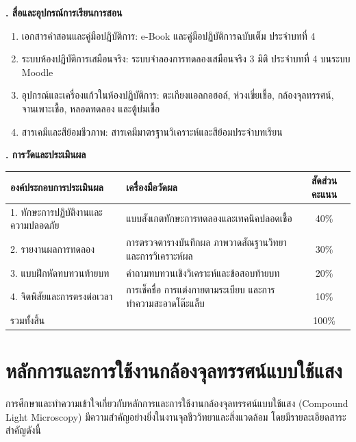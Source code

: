 \noindent\textbf{. สื่อและอุปกรณ์การเรียนการสอน}

\begin{enumerate}
    \item เอกสารคำสอนและคู่มือปฏิบัติการ: e-Book และคู่มือปฏิบัติการฉบับเต็ม ประจำบทที่ 4
    \item ระบบห้องปฏิบัติการเสมือนจริง: ระบบจำลองการทดลองเสมือนจริง 3 มิติ ประจำบทที่ 4 บนระบบ Moodle
    \item อุปกรณ์และเครื่องแก้วในห้องปฏิบัติการ: ตะเกียงแอลกอฮอล์, ห่วงเขี่ยเชื้อ, กล้องจุลทรรศน์, จานเพาะเชื้อ, หลอดทดลอง และตู้บ่มเชื้อ
    \item สารเคมีและสีย้อมชีวภาพ: สารเคมีมาตรฐานวิเคราะห์และสีย้อมประจำบทเรียน
\end{enumerate}

\noindent\textbf{. การวัดและประเมินผล}

\begin{table}[H]
\centering\small
\begin{tabularx}{\textwidth}{p{} p{} c}
\toprule
\textbf{องค์ประกอบการประเมินผล} & \textbf{เครื่องมือวัดผล} & \textbf{สัดส่วนคะแนน} \\
\midrule
1. ทักษะการปฏิบัติงานและความปลอดภัย & แบบสังเกตทักษะการทดลองและเทคนิคปลอดเชื้อ & 40\% \\
2. รายงานผลการทดลอง & การตรวจตารางบันทึกผล ภาพวาดสัณฐานวิทยา และการวิเคราะห์ผล & 30\% \\
3. แบบฝึกหัดทบทวนท้ายบท & คำถามทบทวนเชิงวิเคราะห์และข้อสอบท้ายบท & 20\% \\
4. จิตพิสัยและการตรงต่อเวลา & การเช็คชื่อ การแต่งกายตามระเบียบ และการทำความสะอาดโต๊ะแล็บ & 10\% \\
รวมทั้งสิ้น &  & 100\% \\
\bottomrule
\end{tabularx}
\end{table}

\newpage


\section{หลักการและการใช้งานกล้องจุลทรรศน์แบบใช้แสง}

การศึกษาและทำความเข้าใจเกี่ยวกับหลักการและการใช้งานกล้องจุลทรรศน์แบบใช้แสง (Compound Light Microscopy) มีความสำคัญอย่างยิ่งในงานจุลชีววิทยาและสิ่งแวดล้อม โดยมีรายละเอียดสาระสำคัญดังนี้

